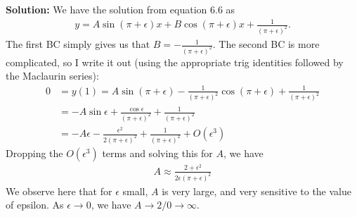 \documentclass[11pt]{article}
\def\f{\frac }
\begin{document}
\begin{enumerate}
\bigskip
\textbf{Solution:} We have the solution from equation 6.6 as 
\begin{align*} y = A \sin (\pi+\epsilon) x + B\cos (\pi+\epsilon) x + \f{1}{(\pi+\epsilon)^2}. \end{align*}
The first BC simply gives us that $B = -\f{1}{(\pi+\epsilon)^2}$.
The second BC is more complicated, so I write it out (using the appropriate trig identities followed by the Maclaurin series):
\begin{align*} 0 &= y(1) = A \sin (\pi+\epsilon) -\f{1}{(\pi+\epsilon)^2} \cos (\pi+\epsilon) + \f{1}{(\pi+\epsilon)^2}\\
&= -A \sin \epsilon + \f{\cos \epsilon }{(\pi+\epsilon)^2} + \f{1}{(\pi+\epsilon)^2}\\
&= -A \epsilon - \f{\epsilon^2 }{2(\pi+\epsilon)^2} + \f{1}{(\pi+\epsilon)^2} + O(\epsilon ^3)\end{align*}
Dropping the $O(\epsilon ^3)$ terms and solving this for $A$, we have
\begin{align*}A \approx \f{2 + \epsilon ^2 }{2\epsilon (\pi+\epsilon)^2}\end{align*}
We observe here that for $\epsilon$ small, $A$ is very large, and very sensitive to the value of epsilon.
As $\epsilon \to 0$, we have $A \to 2/0 \to \infty$.\\



\end{enumerate}
\end{document}
